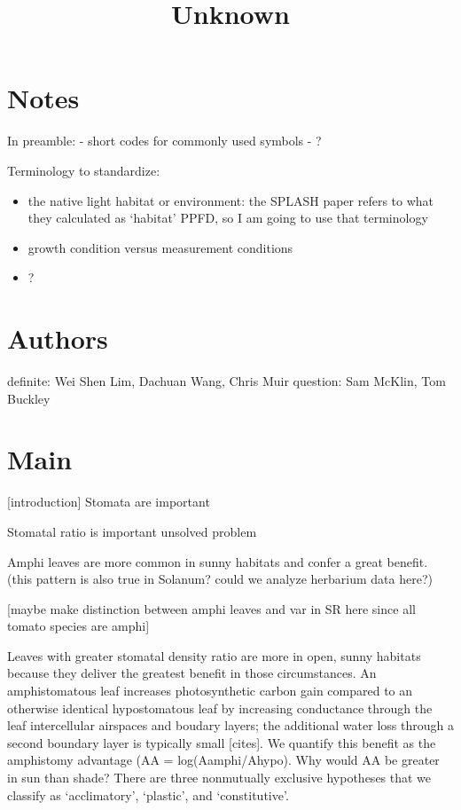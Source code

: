 \documentclass[
  letterpaper,
  DIV=11,
  numbers=noendperiod]{scrartcl}
\title{Unknown}
\author{}
\date{}
\renewcommand*\contentsname{Table of contents}
\newcommand\contentsname{Table of contents}
\begin{document}
\maketitle

\renewcommand*\contentsname{Table of contents}
{
\hypersetup{linkcolor=}
\setcounter{tocdepth}{3}
\tableofcontents
}
\section{Notes}\label{notes}

In preamble: - short codes for commonly used symbols - ?

Terminology to standardize:

\begin{itemize}
\item
  the native light habitat or environment: the SPLASH paper refers to
  what they calculated as `habitat' PPFD, so I am going to use that
  terminology
\item
  growth condition versus measurement conditions
\item
  ?
\end{itemize}

\section{Authors}\label{authors}

definite: Wei Shen Lim, Dachuan Wang, Chris Muir question: Sam McKlin,
Tom Buckley

\section{Main}\label{main}

{[}introduction{]} Stomata are important

Stomatal ratio is important unsolved problem

Amphi leaves are more common in sunny habitats and confer a great
benefit. (this pattern is also true in Solanum? could we analyze
herbarium data here?)

{[}maybe make distinction between amphi leaves and var in SR here since
all tomato species are amphi{]}

Leaves with greater stomatal density ratio are more in open, sunny
habitats because they deliver the greatest benefit in those
circumstances. An amphistomatous leaf increases photosynthetic carbon
gain compared to an otherwise identical hypostomatous leaf by increasing
conductance through the leaf intercellular airspaces and boudary layers;
the additional water loss through a second boundary layer is typically
small {[}cites{]}. We quantify this benefit as the amphistomy advantage
(AA = log(Aamphi/Ahypo). Why would AA be greater in sun than shade?
There are three nonmutually exclusive hypotheses that we classify as
`acclimatory', `plastic', and `constitutive'.
\end{document}
